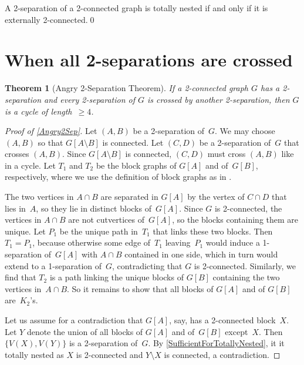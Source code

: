 \documentclass{aic}
\theoremstyle{plain}
\newtheorem{thm}{Theorem}[section]
\theoremstyle{definition}
\theoremstyle{plain}
\theoremstyle{plain}
\newcommand{\sm}{\setminus}
\renewcommand{\ge}{\geqslant}
\begin{document}
\begin{cor}\label{SufficientForTotallyNested}
A 2-separation of a 2-connected graph is totally nested if and only if it is externally 2-connected.\qed
\end{cor}





\section{When all 2-separations are crossed}

\begin{thm}[Angry 2-Separation Theorem]\label{Angry2Sep}
If a 2-connected graph $G$ has a 2-separation and every 2-separation of $G$ is crossed by another 2-separation, then $G$ is a cycle of length~$\ge 4$.
\end{thm}


\begin{proof}[Proof of \autoref{Angry2Sep}]
Let $(A,B)$ be a 2-separation of~$G$.
We may choose $(A,B)$ so that $G[A\sm B]$ is connected.
Let $(C,D)$ be a 2-separation of~$G$ that crosses $(A,B)$.
Since $G[A\sm B]$ is connected, $(C,D)$ must cross $(A,B)$ like in a cycle.
Let $T_1$ and $T_2$ be the block graphs of $G[A]$ and of~$G[B]$, respectively, where we use the definition of block graphs as in \cite[§3.1]{DiestelBookCurrent}.

The two vertices in $A\cap B$ are separated in $G[A]$ by the vertex of $C\cap D$ that lies in~$A$, so they lie in distinct blocks of~$G[A]$.
Since $G$ is 2-connected, the vertices in $A\cap B$ are not cutvertices of~$G[A]$, so the blocks containing them are unique.
Let $P_1$ be the unique path in~$T_1$ that links these two blocks.
Then $T_1=P_1$, because otherwise some edge of~$T_1$ leaving~$P_1$ would induce a 1-separation of~$G[A]$ with $A\cap B$ contained in one side, which in turn would extend to a 1-separation of~$G$, contradicting that $G$ is 2-connected.
Similarly, we find that $T_2$ is a path linking the unique blocks of $G[B]$ containing the two vertices in~$A\cap B$.
So it remains to show that all blocks of $G[A]$ and of $G[B]$ are~$K_2$'s.

Let us assume for a contradiction that $G[A]$, say, has a 2-connected block~$X$.
Let $Y$ denote the union of all blocks of $G[A]$ and of~$G[B]$ except~$X$.
Then $\{V(X),V(Y)\}$ is a 2-separation of~$G$.
By \autoref{SufficientForTotallyNested}, it it totally nested as $X$ is 2-connected and $Y\sm X$ is connected, a contradiction.
\end{proof}
\end{document}
